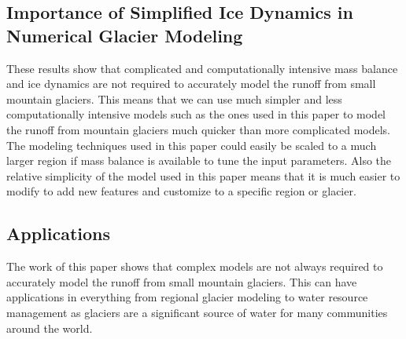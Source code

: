 \documentclass{article}
\begin{document}
\subsection{Importance of Simplified Ice Dynamics in Numerical Glacier Modeling}
These results show that complicated and computationally intensive mass balance and ice dynamics are not required to accurately model the 
runoff from small mountain glaciers. This means that we can use much simpler and less computationally intensive models such as the ones used 
in this paper to model the runoff from mountain glaciers much quicker than more complicated models. The modeling techniques used in this paper could easily be 
scaled to a much larger region if mass balance is available to tune the input parameters. Also the relative simplicity of the model used in 
this paper means that it is much easier to modify to add new features and customize to a specific region or glacier.

\subsection{Applications}
The work of this paper shows that complex models are not always required to accurately model the runoff from small mountain glaciers. This 
can have applications in everything from regional glacier modeling to water resource management as glaciers are a significant source of water 
for many communities around the world. 
\end{document}
